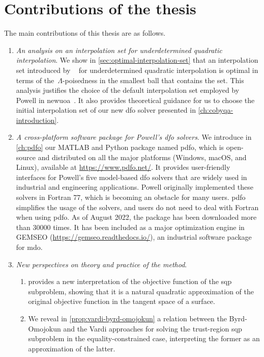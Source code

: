 \section{Contributions of the thesis}

The main contributions of this thesis are as follows.

\begin{enumerate}
    \item \emph{An analysis on an interpolation set for underdetermined quadratic interpolation}.
    We show in \cref{sec:optimal-interpolation-set} that an interpolation set introduced by \citeauthor{Powell_2006}~\cite{Powell_2006} for underdetermined quadratic interpolation is optimal in terms of the~$\Lambda$-poisedness in the smallest ball that contains the set.
    This analysis justifies the choice of the default interpolation set employed by Powell in \gls{newuoa}~\cite{Powell_2006}.
    It also provides theoretical guidance for us to choose the initial interpolation set of our new \gls{dfo} solver presented in \cref{ch:cobyqa-introduction}.
    \item \emph{A cross-platform software package for Powell's \gls{dfo} solvers}.
    We introduce in \cref{ch:pdfo} our MATLAB and Python package named \gls{pdfo}, which is open-source and distributed on all the major platforms (Windows, macOS, and Linux), available at \url{https://www.pdfo.net/}.
    It provides user-friendly interfaces for Powell's five model-based \gls{dfo} solvers that are widely used in industrial and engineering applications.
    Powell originally implemented these solvers in Fortran 77, which is becoming an obstacle for many users.
    \Gls{pdfo} simplifies the usage of the solvers, and users do not need to deal with Fortran when using \gls{pdfo}.
    As of August 2022, the package has been downloaded more than \num{30000} times.
    It has been included as a major optimization engine in GEMSEO (\url{https://gemseo.readthedocs.io/}), an industrial software package for \gls{mdo}.
    \item \emph{New perspectives on theory and practice of the  method}.
    \begin{enumerate}
        \item {} provides a new interpretation of the objective function of the \gls{sqp} subproblem, showing that it is a natural quadratic approximation of the original objective function in the tangent space of a surface.
        \item We reveal in \cref{prop:vardi-byrd-omojokun} a relation between the Byrd-Omojokun and the Vardi approaches for solving the trust-region \gls{sqp} subproblem in the equality-constrained case, interpreting the former as an approximation of the latter.

\end{enumerate}
\end{enumerate}
